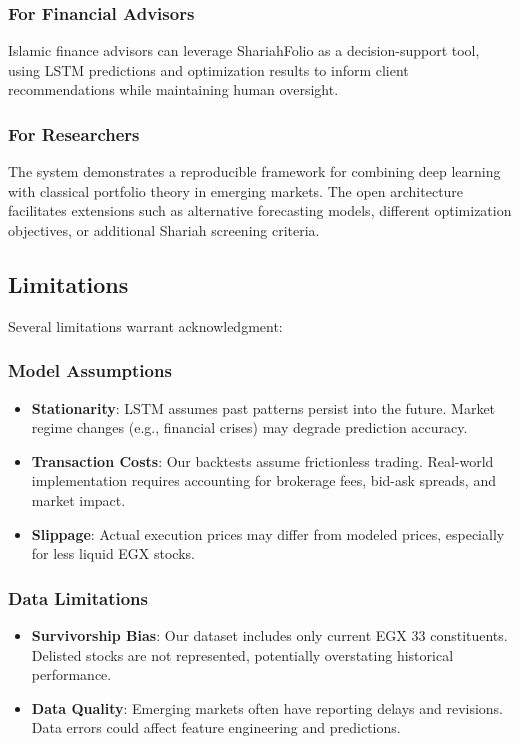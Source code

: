 \documentclass[conference]{IEEEtran}
\begin{document}
\subsubsection{For Financial Advisors}
Islamic finance advisors can leverage ShariahFolio as a decision-support tool, using LSTM predictions and optimization results to inform client recommendations while maintaining human oversight.

\subsubsection{For Researchers}
The system demonstrates a reproducible framework for combining deep learning with classical portfolio theory in emerging markets. The open architecture facilitates extensions such as alternative forecasting models, different optimization objectives, or additional Shariah screening criteria.

\subsection{Limitations}

Several limitations warrant acknowledgment:

\subsubsection{Model Assumptions}
\begin{itemize}
\item \textbf{Stationarity}: LSTM assumes past patterns persist into the future. Market regime changes (e.g., financial crises) may degrade prediction accuracy.
\item \textbf{Transaction Costs}: Our backtests assume frictionless trading. Real-world implementation requires accounting for brokerage fees, bid-ask spreads, and market impact.
\item \textbf{Slippage}: Actual execution prices may differ from modeled prices, especially for less liquid EGX stocks.
\end{itemize}

\subsubsection{Data Limitations}
\begin{itemize}
\item \textbf{Survivorship Bias}: Our dataset includes only current EGX 33 constituents. Delisted stocks are not represented, potentially overstating historical performance.
\item \textbf{Data Quality}: Emerging markets often have reporting delays and revisions. Data errors could affect feature engineering and predictions.
\end{itemize}
\end{document}
